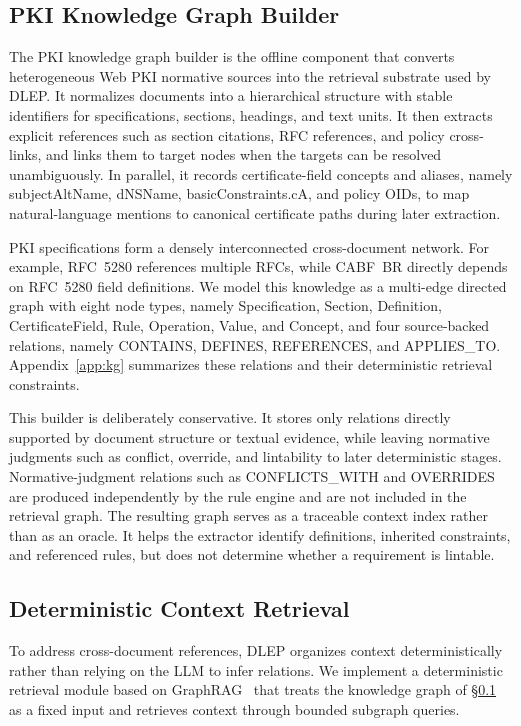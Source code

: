 \subsection{PKI Knowledge Graph Builder}
\label{sec:method-kg-builder}

The PKI knowledge graph builder is the offline component that converts heterogeneous Web PKI normative sources into the retrieval substrate used by DLEP.
It normalizes documents into a hierarchical structure with stable identifiers for specifications, sections, headings, and text units.
It then extracts explicit references such as section citations, RFC references, and policy cross-links, and links them to target nodes when the targets can be resolved unambiguously.
In parallel, it records certificate-field concepts and aliases, namely subjectAltName, dNSName, basicConstraints.cA, and policy OIDs, to map natural-language mentions to canonical certificate paths during later extraction.

PKI specifications form a densely interconnected cross-document network.
For example, RFC~5280 references multiple RFCs, while CABF~BR directly depends on RFC~5280 field definitions.
We model this knowledge as a multi-edge directed graph with eight node types, namely Specification, Section, Definition, CertificateField, Rule, Operation, Value, and Concept, and four source-backed relations, namely CONTAINS, DEFINES, REFERENCES, and APPLIES\_TO. Appendix~\ref{app:kg} summarizes these relations and their deterministic retrieval constraints.

This builder is deliberately conservative.
It stores only relations directly supported by document structure or textual evidence, while leaving normative judgments such as conflict, override, and lintability to later deterministic stages.
Normative-judgment relations such as CONFLICTS\_WITH and OVERRIDES are produced independently by the rule engine and are not included in the retrieval graph.
The resulting graph serves as a traceable context index rather than as an oracle. It helps the extractor identify definitions, inherited constraints, and referenced rules, but does not determine whether a requirement is lintable.

\subsection{Deterministic Context Retrieval}
\label{sec:method-graphrag}

To address cross-document references, DLEP organizes context deterministically rather than relying on the LLM to infer relations.
We implement a deterministic retrieval module based on GraphRAG~\cite{edge2024local} that treats the knowledge graph of \S\ref{sec:method-kg-builder} as a fixed input and retrieves context through bounded subgraph queries.

